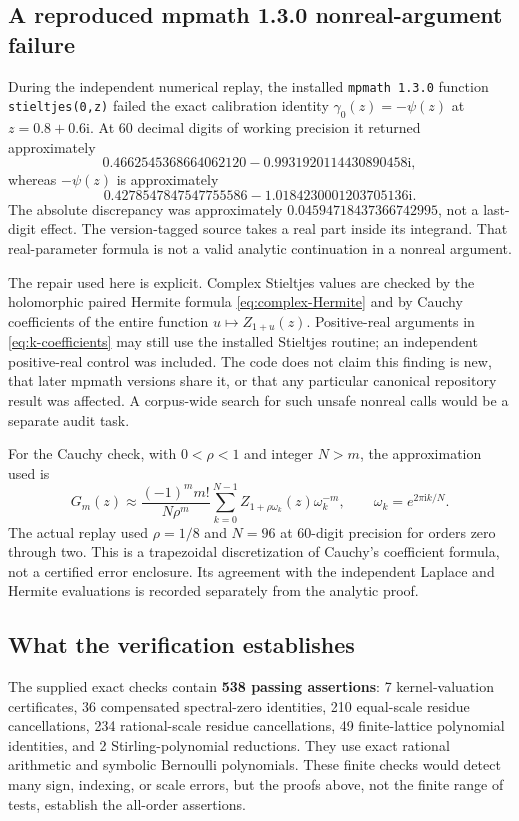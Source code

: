 \documentclass[11pt,a4paper]{article}
\theoremstyle{definition}
\numberwithin{equation}{section}
\newcommand{\ii}{\mathrm i}
\begin{document}
\subsection{A reproduced mpmath 1.3.0 nonreal-argument failure}
\label{sec:software-audit}
During the independent numerical replay, the installed
\texttt{mpmath 1.3.0} function \texttt{stieltjes(0,z)} failed the exact
calibration identity $\gamma_0(z)=-\psi(z)$ at $z=0.8+0.6\ii$.
At 60 decimal digits of working precision it returned approximately
\[
 0.4662545368664062120-0.9931920114430890458\ii,
\]
whereas $-\psi(z)$ is approximately
\[
 0.4278547847547755586-1.0184230001203705136\ii.
\]
The absolute discrepancy was approximately
$0.04594718437366742995$, not a last-digit effect.
The version-tagged source \cite{mpmath13} takes a real part inside its
integrand. That real-parameter formula is not a valid analytic continuation
in a nonreal argument.

The repair used here is explicit. Complex Stieltjes values are checked by
the holomorphic paired Hermite formula \eqref{eq:complex-Hermite} and by
Cauchy coefficients of the entire function $u\mapsto Z_{1+u}(z)$.
Positive-real arguments in \eqref{eq:k-coefficients} may still use the
installed Stieltjes routine; an independent positive-real control was
included. The code does not claim this finding is new, that later mpmath
versions share it, or that any particular canonical repository result
was affected. A corpus-wide search for such unsafe nonreal calls would
be a separate audit task.

For the Cauchy check, with $0<\rho<1$ and integer $N>m$, the approximation
used is
\begin{equation}\label{eq:Cauchy-diagnostic}
 G_m(z)\approx\frac{(-1)^m m!}{N\rho^m}
   \sum_{k=0}^{N-1}Z_{1+\rho\omega_k}(z)\omega_k^{-m},
 \qquad \omega_k=e^{2\pi\ii k/N}.
\end{equation}
The actual replay used $\rho=1/8$ and $N=96$ at 60-digit precision for
orders zero through two. This is a trapezoidal discretization of Cauchy's
coefficient formula, not a certified error enclosure. Its agreement with
the independent Laplace and Hermite evaluations is recorded separately
from the analytic proof.

\subsection{What the verification establishes}
The supplied exact checks contain \textbf{538 passing assertions}:
7 kernel-valuation certificates, 36 compensated spectral-zero identities,
210 equal-scale residue cancellations, 234 rational-scale residue
cancellations, 49 finite-lattice polynomial identities, and 2
Stirling-polynomial reductions. They use exact rational arithmetic and
symbolic Bernoulli polynomials. These finite checks would detect many
sign, indexing, or scale errors, but the proofs above, not the finite
range of tests, establish the all-order assertions.
\end{document}
